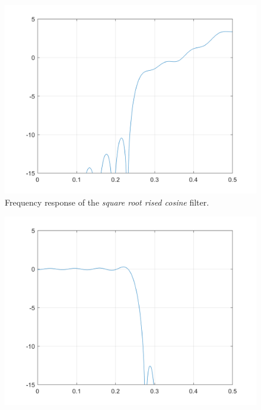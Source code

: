 \documentclass[a4paper, 12pt]{report}
\begin{document}
\begin{figure}[H]
	\centering
	\includegraphics[width=14cm]{Q_r}
	\caption{Frequency response of the \textit{square root rised cosine} filter.}\label{Q_r}
\end{figure}

\begin{figure}[H]
	\centering
	\includegraphics[width=14cm]{G_srrc}
	\caption{}\label{G_srrc}
\end{figure}
\end{document}
